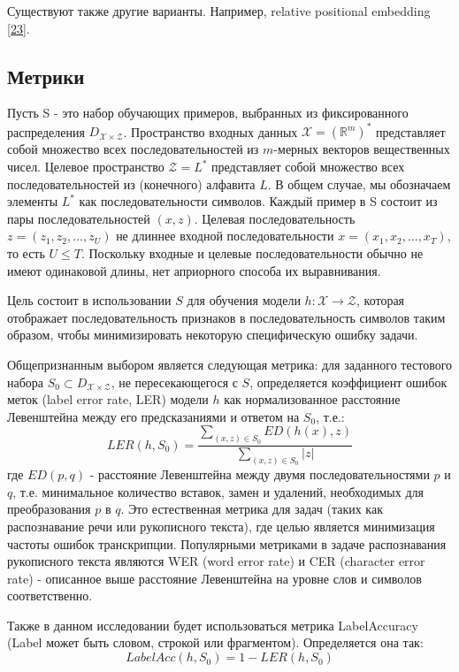 Существуют также другие варианты. Например, relative positional embedding \hyperlink{cite.Sha18}{[23]}.

\subsection{Метрики}
Пусть S - это набор обучающих примеров, выбранных из фиксированного распределения $D_{\mathcal{X} \times \mathcal{Z}}$. Пространство входных данных $\mathcal{X} = (\mathbb{R}^m)^*$ представляет собой множество всех последовательностей из $m$-мерных векторов вещественных чисел. Целевое пространство $\mathcal{Z} = L^*$ представляет собой множество всех последовательностей из (конечного) алфавита $L$. В общем случае, мы обозначаем элементы $L^*$ как последовательности символов. Каждый пример в S состоит из пары последовательностей $(x, z)$. Целевая последовательность $z = (z_1, z_2, ..., z_U)$ не длиннее входной последовательности $x = (x_1, x_2, ..., x_T)$, то есть $U \leq T$. Поскольку входные и целевые последовательности обычно не имеют одинаковой длины, нет априорного способа их выравнивания.

Цель состоит в использовании $S$ для обучения модели $h : \mathcal{X} \rightarrow \mathcal{Z}$, которая отображает последовательность признаков в последовательность символов таким образом, чтобы минимизировать некоторую специфическую ошибку задачи.

Общепризнанным выбором является следующая метрика: для заданного тестового набора $S_0 \subset D_{\mathcal{X} \times \mathcal{Z}}$, не пересекающегося с $S$, определяется коэффициент ошибок меток (label error rate, LER) модели $h$ как нормализованное расстояние Левенштейна между его предсказаниями и ответом на $S_0$, т.е.:
\begin{equation}
	LER(h, S_0) = \frac{\sum_{(x,z) \in S_0} ED(h(x), z)}{\sum_{(x,z) \in S_0} |z|}
\end{equation}
где $ED(p, q)$ - расстояние Левенштейна между двумя последовательностями $p$ и $q$, т.е. минимальное количество вставок, замен и удалений, необходимых для преобразования $p$ в $q$.
Это естественная метрика для задач (таких как распознавание речи или рукописного текста), где целью является минимизация частоты ошибок транскрипции. Популярными метриками в задаче распознавания рукописного текста являются WER (word error rate) и CER (character error rate) - описанное выше расстояние Левенштейна на уровне слов и символов соответственно.

Также в данном исследовании будет использоваться метрика LabelAccuracy (Label может быть словом, строкой или фрагментом). Определяется она так:
\begin{equation}
	LabelAcc(h, S_0) = 1 - LER(h, S_0)
\end{equation}


